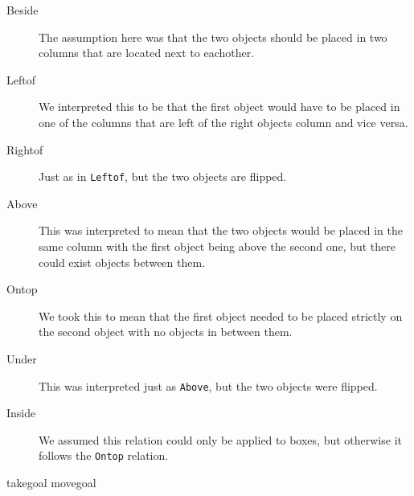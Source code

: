 \documentclass[11pt]{article}
\begin{document}
\begin{description}
  \item[Beside] The assumption here was that the two objects should be placed in
    two columns that are located next to eachother.
  \item[Leftof] We interpreted this to be that the first object would have to be
    placed in one of the columns that are left of the right objects column and
    vice versa.
  \item[Rightof] Just as in \verb|Leftof|, but the two objects are flipped.
  \item[Above] This was interpreted to mean that the two objects would be placed
    in the same column with the first object being above the second one, but
    there could exist objects between them.
  \item[Ontop] We took this to mean that the first object needed to be placed
   strictly on the second object with no objects in between them.
  \item[Under] This was interpreted just as \verb|Above|, but the two objects
    were flipped.
  \item[Inside] We assumed this relation could only be applied to boxes, but
  otherwise it follows the \verb|Ontop| relation.
\end{description}
takegoal movegoal











\end{document}
